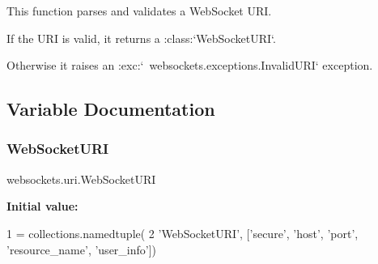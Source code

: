\begin{DoxyVerb}This function parses and validates a WebSocket URI.

If the URI is valid, it returns a :class:`WebSocketURI`.

Otherwise it raises an :exc:`~websockets.exceptions.InvalidURI` exception.\end{DoxyVerb}
 

\subsection{Variable Documentation}
\mbox{\label{namespacewebsockets_1_1uri_a03868e2a55279756aef3de8dfc4c743c}} 
\subsubsection{\texorpdfstring{Web\+Socket\+U\+RI}{WebSocketURI}}
{\footnotesize\ttfamily websockets.\+uri.\+Web\+Socket\+U\+RI}

{\bfseries Initial value\+:}
\begin{DoxyCode}
1 =  collections.namedtuple(
2     \textcolor{stringliteral}{'WebSocketURI'}, [\textcolor{stringliteral}{'secure'}, \textcolor{stringliteral}{'host'}, \textcolor{stringliteral}{'port'}, \textcolor{stringliteral}{'resource\_name'}, \textcolor{stringliteral}{'user\_info'}])
\end{DoxyCode}

